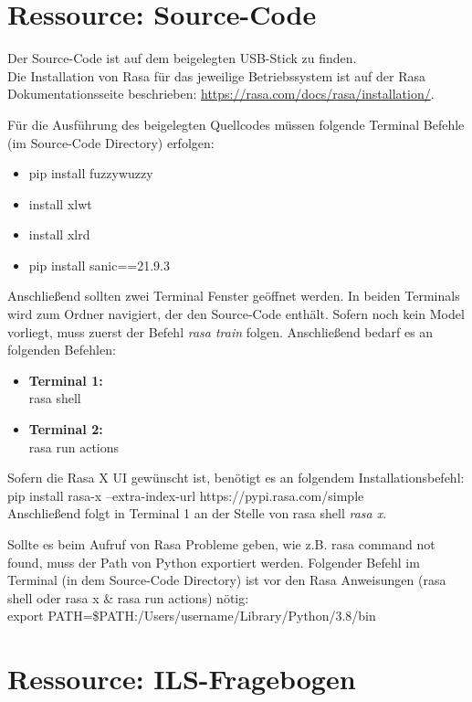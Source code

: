\chapter{Ressource: Source-Code} \label{Source-Code}
Der Source-Code ist auf dem beigelegten USB-Stick zu finden.\\
Die Installation von Rasa für das jeweilige Betriebssystem ist auf der Rasa Dokumentationsseite beschrieben: 
\url{https://rasa.com/docs/rasa/installation/}.

Für die Ausführung des beigelegten Quellcodes müssen folgende Terminal Befehle (im Source-Code Directory) erfolgen:
\begin{itemize}
  \item pip install fuzzywuzzy
  \item install xlwt
  \item install xlrd 
  \item pip install sanic==21.9.3
\end{itemize}

Anschließend sollten zwei Terminal Fenster geöffnet werden. In beiden Terminals wird zum Ordner navigiert, der den Source-Code enthält.
Sofern noch kein Model vorliegt, muss zuerst der Befehl \textit{rasa train} folgen. Anschließend bedarf es an folgenden Befehlen:
\begin{itemize}
  \item \textbf{Terminal 1:} \\
        rasa shell
  \item \textbf{Terminal 2:} \\
        rasa run actions
\end{itemize}

Sofern die Rasa X UI gewünscht ist, benötigt es an folgendem Installationsbefehl:\\
pip install rasa-x --extra-index-url https://pypi.rasa.com/simple \\ 
Anschließend folgt in Terminal 1 an der Stelle von rasa shell \textit{rasa x}.

Sollte es beim Aufruf von Rasa Probleme geben, wie z.B. \glqq rasa command not found\grqq{}, muss der Path von Python exportiert werden.
Folgender Befehl im Terminal (in dem Source-Code Directory) ist vor den Rasa Anweisungen (rasa shell oder rasa x \& rasa run actions) nötig:\\
export PATH=\$PATH:/Users/username/Library/Python/3.8/bin


\chapter{Ressource: ILS-Fragebogen} 

